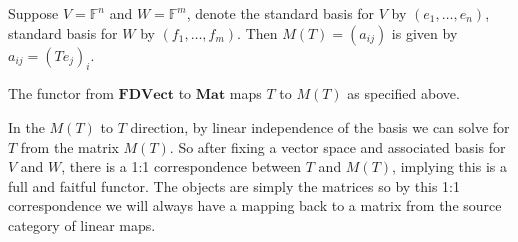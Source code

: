 \documentclass{article}
\begin{document}
Suppose $V=\mathds{F}^n$ and $W=\mathds{F}^m$, denote the standard basis for $V$ by $(e_1, \dots, e_n)$, standard basis for $W$ by $(f_1, \dots, f_m)$. Then $M(T) = ( a_{ij} ) $ is given by $a_{ij} = (Te_j)_i$.

The functor from $\mathbf{FDVect}$ to $\mathbf{Mat}$ maps $T$ to $M(T)$ as specified above.

In the $M(T)$ to $T$ direction, by linear independence of the basis we can solve for $T$ from the matrix $M(T)$. So after fixing a vector space and associated basis for $V$ and $W$, there is a 1:1 correspondence between $T$ and $M(T)$, implying this is a full and faitful functor. The objects are simply the matrices so by this 1:1 correspondence we will always have a mapping back to a matrix from the source category of linear maps.
\end{document}
